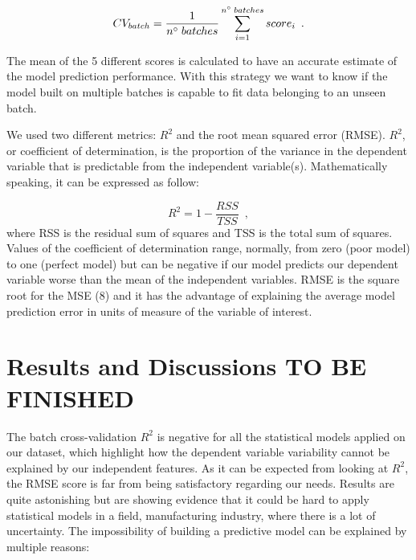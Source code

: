 \begin{equation}
    CV_{batch} = \frac{1}{n\degree\;batches}\sum_{i=1}^{n\degree\;batches}score_{i}
    \enspace.
\end{equation}

The mean of the 5 different scores is calculated to have an accurate estimate of the model prediction performance. With this strategy we want to know if the model built on multiple batches is capable to fit data belonging to an unseen batch.  

We used two different metrics: $R^2$ and the root mean squared error (RMSE). $R^2$, or coefficient of determination, is the proportion of the variance in the dependent variable that is predictable from the independent variable(s). Mathematically speaking, it can be expressed as follow:

\begin{equation}
    R^2 = 1 - \frac{RSS}{TSS}
    \enspace,
\end{equation}
where RSS is the residual sum of squares and TSS is the total sum of squares.
Values of the coefficient of determination range, normally, from zero (poor model) to one (perfect model) but can be negative if our model predicts our dependent variable worse than the mean of the independent variables. RMSE is the square root for the MSE (8) and it has the advantage of explaining the average model prediction error in units of measure of the variable of interest. 


\section{Results and Discussions TO BE FINISHED} \label{Results and Discussions}

The batch cross-validation $R^2$ is negative for all the statistical models applied on our dataset, which highlight how the dependent variable variability cannot be explained by our independent features. As it can be expected from looking at $R^2$, the RMSE score is far from being satisfactory regarding our needs. 
Results are quite astonishing but are showing evidence that it could be hard to apply statistical models in a field, manufacturing industry, where there is a lot of uncertainty. 
The impossibility of building a predictive model can be explained by multiple reasons:  

